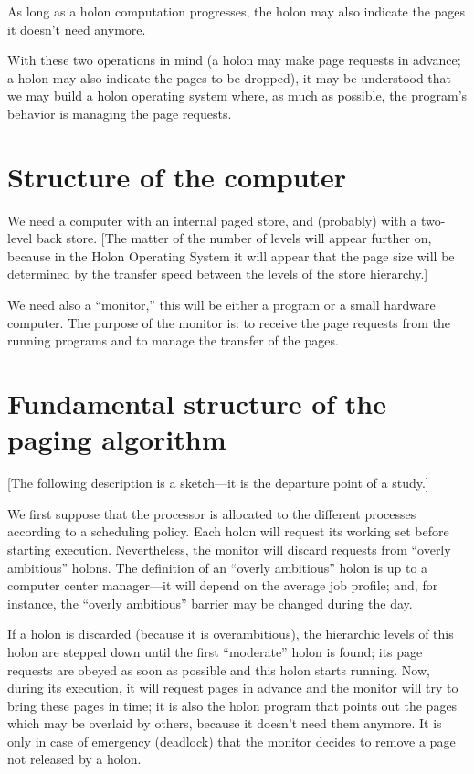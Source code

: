 \documentclass[openany,nobib]{tufte-book}
\begin{document}
As long as a holon computation progresses, the holon may also indicate the
pages it doesn't need anymore.

With these two operations in mind (a holon may make page requests in advance; a
holon may also indicate the pages to be dropped), it may be understood that we
may build a holon operating system where, as much as possible, the program's
behavior is managing the page requests.

\section{Structure of the computer}

We need a computer with an internal paged store, and (probably) with a
two-level back store. [The matter of the number of levels will appear further
on, because in the Holon Operating System it will appear that the page size
will be determined by the transfer speed between the levels of the store
hierarchy.]

We need also a ``monitor,'' this will be either a program or a small hardware
computer. The purpose of the monitor is: to receive the page requests from the
running programs and to manage the transfer of the pages.

\section{Fundamental structure of the paging algorithm}

[The following description is a sketch---it is the departure point of a study.]

We first suppose that the processor is allocated to the different processes
according to a scheduling policy. Each holon will request its working set
before starting execution. Nevertheless, the monitor will discard requests from
``overly ambitious'' holons. The definition of an ``overly ambitious'' holon is
up to a computer center manager---it will depend on the average job profile;
and, for instance, the ``overly ambitious'' barrier may be changed during the
day.

If a holon is discarded (because it is overambitious), the hierarchic levels of
this holon are stepped down until the first ``moderate'' holon is found; its
page requests are obeyed as soon as possible and this holon starts running.
Now, during its execution, it will request pages in advance and the monitor
will try to bring these pages in time; it is also the holon program that points
out the pages which may be overlaid by others, because it doesn't need them
anymore. It is only in case of emergency (deadlock) that the monitor decides to
remove a page not released by a holon.
\end{document}
